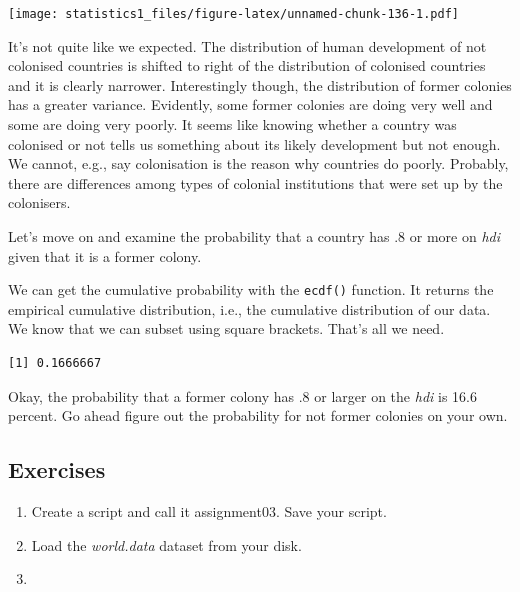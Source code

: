 \documentclass[]{book}
\newenvironment{Shaded}{\begin{snugshade}}{\end{snugshade}}
\newcommand{\KeywordTok}[1]{\textcolor[rgb]{0.13,0.29,0.53}{\textbf{#1}}}
\newcommand{\DecValTok}[1]{\textcolor[rgb]{0.00,0.00,0.81}{#1}}
\newcommand{\StringTok}[1]{\textcolor[rgb]{0.31,0.60,0.02}{#1}}
\newcommand{\OperatorTok}[1]{\textcolor[rgb]{0.81,0.36,0.00}{\textbf{#1}}}
\newcommand{\NormalTok}[1]{#1}
\theoremstyle{definition}
\theoremstyle{definition}
\theoremstyle{definition}
\theoremstyle{remark}
\begin{document}
\texttt{[image: statistics1\_files/figure-latex/unnamed-chunk-136-1.pdf]}

It's not quite like we expected. The distribution of human development
of not colonised countries is shifted to right of the distribution of
colonised countries and it is clearly narrower. Interestingly though,
the distribution of former colonies has a greater variance. Evidently,
some former colonies are doing very well and some are doing very poorly.
It seems like knowing whether a country was colonised or not tells us
something about its likely development but not enough. We cannot, e.g.,
say colonisation is the reason why countries do poorly. Probably, there
are differences among types of colonial institutions that were set up by
the colonisers.

Let's move on and examine the probability that a country has .8 or more
on \emph{hdi} given that it is a former colony.

We can get the cumulative probability with the \texttt{ecdf()} function.
It returns the empirical cumulative distribution, i.e., the cumulative
distribution of our data. We know that we can subset using square
brackets. That's all we need.

\begin{Shaded}
\end{Shaded}

\begin{verbatim}
[1] 0.1666667
\end{verbatim}

Okay, the probability that a former colony has .8 or larger on the
\emph{hdi} is 16.6 percent. Go ahead figure out the probability for not
former colonies on your own.

\subsection{Exercises}\label{exercises-2}

\begin{enumerate}
\def\labelenumi{\arabic{enumi}.}
\item
  Create a script and call it assignment03. Save your script.
\item
  Load the \emph{world.data} dataset from your disk.
\item
\end{enumerate}
\end{document}
